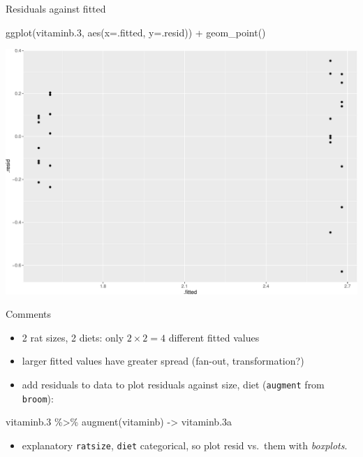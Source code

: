 \documentclass[
  ignorenonframetext,
]{beamer}
\newenvironment{Shaded}{\begin{snugshade}}{\end{snugshade}}
\newcommand{\AttributeTok}[1]{\textcolor[rgb]{0.40,0.45,0.13}{#1}}
\newcommand{\FloatTok}[1]{\textcolor[rgb]{0.68,0.00,0.00}{#1}}
\newcommand{\FunctionTok}[1]{\textcolor[rgb]{0.28,0.35,0.67}{#1}}
\newcommand{\NormalTok}[1]{\textcolor[rgb]{0.00,0.23,0.31}{#1}}
\newcommand{\OtherTok}[1]{\textcolor[rgb]{0.00,0.23,0.31}{#1}}
\newcommand{\SpecialCharTok}[1]{\textcolor[rgb]{0.37,0.37,0.37}{#1}}
\providecommand{\tightlist}{%
  \setlength{\itemsep}{0pt}\setlength{\parskip}{0pt}}\usepackage{longtable,booktabs,array}
\begin{document}
\begin{frame}[fragile]{Residuals against fitted}
\protect\hypertarget{residuals-against-fitted}{}
\begin{Shaded}
\begin{Highlighting}[]
\FunctionTok{ggplot}\NormalTok{(vitaminb}\FloatTok{.3}\NormalTok{, }\FunctionTok{aes}\NormalTok{(}\AttributeTok{x=}\NormalTok{.fitted, }\AttributeTok{y=}\NormalTok{.resid)) }\SpecialCharTok{+} \FunctionTok{geom\_point}\NormalTok{()}
\end{Highlighting}
\end{Shaded}

\includegraphics{anova_files/figure-beamer/bAnova-19-1.pdf}
\end{frame}

\begin{frame}[fragile]{Comments}
\protect\hypertarget{comments-1}{}
\begin{itemize}
\tightlist
\item
  2 rat sizes, 2 diets: only \(2 \times 2 = 4\) different fitted values
\item
  larger fitted values have greater spread (fan-out, transformation?)
\item
  add residuals to data to plot residuals against size, diet
  (\texttt{augment} from \texttt{broom}):
\end{itemize}

\begin{Shaded}
\begin{Highlighting}[]
\NormalTok{vitaminb}\FloatTok{.3} \SpecialCharTok{\%\textgreater{}\%} \FunctionTok{augment}\NormalTok{(vitaminb) }\OtherTok{{-}\textgreater{}}\NormalTok{ vitaminb}\FloatTok{.3}\NormalTok{a}
\end{Highlighting}
\end{Shaded}

\begin{itemize}
\tightlist
\item
  explanatory \texttt{ratsize}, \texttt{diet} categorical, so plot resid
  vs.~them with \emph{boxplots}.
\end{itemize}
\end{frame}
\end{document}
